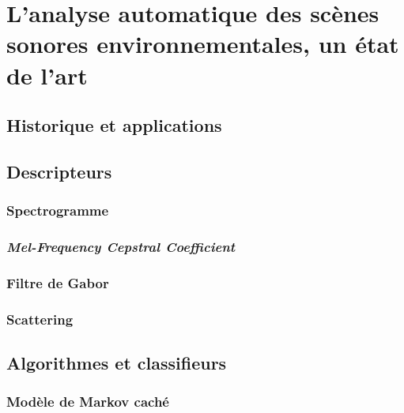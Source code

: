 \chapter[État de l'art]{L'analyse automatique des scènes sonores environnementales, un état de l'art}\label{ch:ml_ea}

\section{Historique et applications}


\section{Descripteurs}

\subsection{Spectrogramme}
\label{sec:ch6_spec}

\subsection{\emph{Mel-Frequency Cepstral Coefficient}}
\label{sec:ch6_mfcc}

 
\subsection{Filtre de Gabor}
\label{sec:ch6_gabor}

\subsection{Scattering}
\label{sec:ch6_scattering}

\section{Algorithmes et classifieurs}

\subsection{Modèle de Markov caché}
\label{sec:ch6_hmm}


